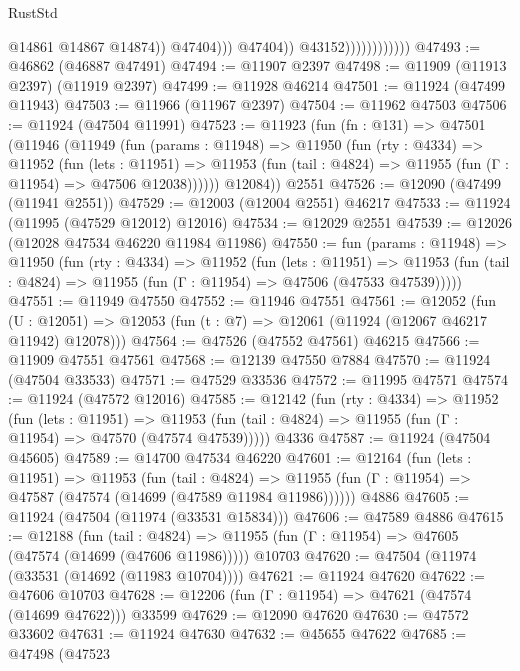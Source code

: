 \begin{lexlean}{RustStd}
\begin{coremodule}
{\begin{coremodule}
{{{{{{{{{{{{{{{{{{{{{{{{{{{{{{{{{{{{{{{{{{{{{{{{{{{{{{{{{{{{{{{{{{{{{{{{{{{{{{{{                                          @14861
                                          @14867
                                          @14874))
                                      @47404)))
                                @47404))
                            @43152))))))))))))
@47493 := @46862 (@46887 @47491)
@47494 := @11907 @2397
@47498 := @11909 (@11913 @2397) (@11919 @2397)
@47499 := @11928 @46214
@47501 := @11924 (@47499 @11943)
@47503 := @11966 (@11967 @2397)
@47504 := @11962 @47503
@47506 := @11924 (@47504 @11991)
@47523 := @11923
    (fun (fn : @131) =>
    @47501
      (@11946
        (@11949
          (fun (params : @11948) =>
          @11950
            (fun (rty : @4334) =>
            @11952
              (fun (lets : @11951) =>
              @11953 (fun (tail : @4824) => @11955 (fun (Γ : @11954) => @47506 @12038))))))
        @12084))
    @2551
@47526 := @12090 (@47499 (@11941 @2551))
@47529 := @12003 (@12004 @2551) @46217
@47533 := @11924 (@11995 (@47529 @12012) @12016)
@47534 := @12029 @2551
@47539 := @12026 (@12028 @47534 @46220 @11984 @11986)
@47550 := fun (params : @11948) =>
  @11950
    (fun (rty : @4334) =>
    @11952
      (fun (lets : @11951) =>
      @11953 (fun (tail : @4824) => @11955 (fun (Γ : @11954) => @47506 (@47533 @47539)))))
@47551 := @11949 @47550
@47552 := @11946 @47551
@47561 := @12052
    (fun (U : @12051) => @12053 (fun (t : @7) => @12061 (@11924 (@12067 @46217 @11942) @12078)))
@47564 := @47526 (@47552 @47561) @46215
@47566 := @11909 @47551 @47561
@47568 := @12139 @47550 @7884
@47570 := @11924 (@47504 @33533)
@47571 := @47529 @33536
@47572 := @11995 @47571
@47574 := @11924 (@47572 @12016)
@47585 := @12142
    (fun (rty : @4334) =>
    @11952
      (fun (lets : @11951) =>
      @11953 (fun (tail : @4824) => @11955 (fun (Γ : @11954) => @47570 (@47574 @47539)))))
    @4336
@47587 := @11924 (@47504 @45605)
@47589 := @14700 @47534 @46220
@47601 := @12164
    (fun (lets : @11951) =>
    @11953
      (fun (tail : @4824) =>
      @11955 (fun (Γ : @11954) => @47587 (@47574 (@14699 (@47589 @11984 @11986))))))
    @4886
@47605 := @11924 (@47504 (@11974 (@33531 @15834)))
@47606 := @47589 @4886
@47615 := @12188
    (fun (tail : @4824) => @11955 (fun (Γ : @11954) => @47605 (@47574 (@14699 (@47606 @11986)))))
    @10703
@47620 := @47504 (@11974 (@33531 (@14692 (@11983 @10704))))
@47621 := @11924 @47620
@47622 := @47606 @10703
@47628 := @12206 (fun (Γ : @11954) => @47621 (@47574 (@14699 @47622))) @33599
@47629 := @12090 @47620
@47630 := @47572 @33602
@47631 := @11924 @47630
@47632 := @45655 @47622
@47685 := @47498
    (@47523
}}}}}}}}}}}}}}}}}}}}}}}}}}}}}}}}}}}}}}}}}}}}}}}}}}}}}}}}}}}}}}}}}}}}}}}}}}}}}}}}
\end{coremodule}}
\end{coremodule}
\end{lexlean}
